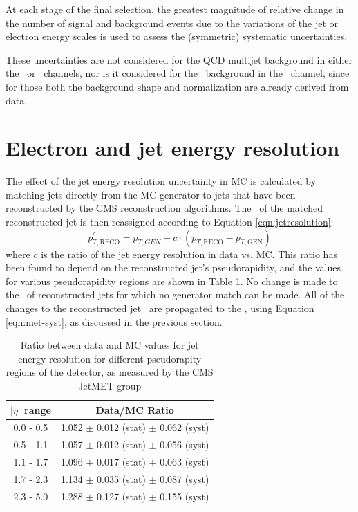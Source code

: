 At each stage of the final selection, 
the greatest magnitude of relative change in the number of signal and 
background events due to the variations 
of the jet or electron energy scales is used to 
assess the (symmetric) systematic uncertainties. 

These uncertainties are not considered for the QCD multijet background in 
either the \eejj~or \enujj~channels, nor is it considered for the \ttbar~background in the \eejj~channel, 
since for those both the background shape and normalization are already 
derived from data.

\section{Electron and jet energy resolution}
\label{sec:jetresolution}

The effect of the jet energy resolution uncertainty in MC is calculated
by matching jets directly from the MC generator to jets that have been reconstructed 
by the CMS reconstruction algorithms.  The \pt~of the matched reconstructed jet is then reassigned
according to Equation \ref{eqn:jetresolution}:
\begin{equation}
\label{eqn:jetresolution}
p_{T, \text{RECO}}^{'} = p_{T, GEN} + c \cdot (p_{T, \text{RECO}} - p_{T, \text{GEN}})
\end{equation}
where $c$ is the ratio of the jet energy resolution in data vs. MC. This ratio
has been found to depend on the reconstructed jet's pseudorapidity, and the values for various pseudorapidity regions are shown in Table 
\ref{tab:jetresolution}.  No change is made to the \pt~of reconstructed jets for which no generator 
match can be made.  All of the changes to the reconstructed jet \pt~are propagated to the \MET, using 
Equation \ref{eqn:met-syst}, as discussed in the previous section.

\begin{table}
  \begin{center}
    \begin{tabular}{c|c}
      $|\eta|$ range & Data/MC Ratio  \\ 
      \hline \hline
      0.0 - 0.5 & 1.052 $\pm$ 0.012 (stat) $\pm$ 0.062 (syst)\\
      0.5 - 1.1 & 1.057 $\pm$ 0.012 (stat) $\pm$ 0.056 (syst)\\
      1.1 - 1.7 & 1.096 $\pm$ 0.017 (stat) $\pm$ 0.063 (syst)\\
      1.7 - 2.3 & 1.134 $\pm$ 0.035 (stat) $\pm$ 0.087 (syst)\\
      2.3 - 5.0 & 1.288 $\pm$ 0.127 (stat) $\pm$ 0.155 (syst)\\
    \end{tabular}
    \caption{Ratio between data and MC values for jet energy resolution for different pseudorapity regions of the detector, as measured by the CMS JetMET group}
    \label{tab:jetresolution}
  \end{center}
\end{table}

